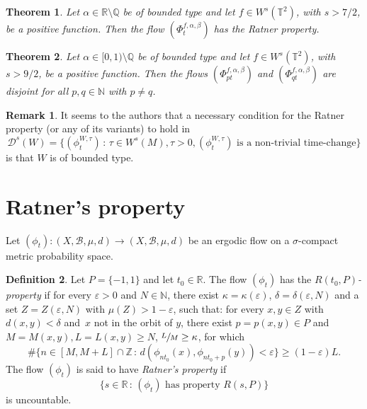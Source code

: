 \documentclass[10pt]{amsart}
\let\mathcal\mathscr
\let\epsilon\varepsilon
\newcommand{\sep}{\,:\,}
\theoremstyle{definition}
\newtheorem{definition}{Definition}[section]
\newtheorem{remark}[definition]{Remark}
\theoremstyle{plain}
\newtheorem{theorem}{Theorem}
\newcommand\NN{\mathbb{N}}
\newcommand\QQ{\mathbb{Q}}
\newcommand\RR{\mathbb{R}}
\newcommand\TT{\mathbb{T}}
\newcommand\ZZ{\mathbb{Z}}
\newcommand\cB{\mathcal{B}}
\newcommand{\cD}{\mathcal D}
\begin{document}
\begin{theorem}\label{thm:main} Let $\alpha\in \RR\setminus \QQ$ be of bounded type and let $f\in W^s(\TT^2)$, with $s>7/2$, be a positive function. Then the flow
$(\Phi_t^{f,\alpha, \beta})$ has the Ratner property.
\end{theorem}

\begin{theorem}\label{thm:main2} Let $\alpha \in [0,1)\setminus \QQ$ be of bounded type and let $f\in W^s(\TT^2)$, with $s>9/2$, be a positive function. Then the flows $(\Phi_{pt}^{f,\alpha,\beta})$ and $(\Phi_{qt}^{f,\alpha,\beta})$ are disjoint for all $p,q\in \NN$ with $p\neq q$.
\end{theorem}

\begin{remark} It seems to the authors that a necessary condition for the Ratner property (or any of its variants) to hold in
\[
\cD^s(W)=\{(\phi_t^{W,\tau})\sep \tau\in W^s(M), \tau>0, (\phi_t^{W,\tau}) \text{ is a non-trivial time-change}\}
\]
is that $W$ is of bounded type.
\end{remark}

\section{Ratner's property}\label{sec:rat}
Let $(\phi_t):(X,\cB,\mu,d)\to (X,\cB,\mu,d)$ be an ergodic flow on a $\sigma$-compact metric probability space.
\begin{definition}\label{def.rat} Let $P=\{-1,1\}$ and let $t_0\in \RR$. The flow $(\phi_t)$ has the \emph{$R(t_0,P)$\nobreakdash-property} if for every $\epsilon>0$ and $N\in \NN$, there exist
$\kappa =\kappa(\epsilon)$, $\delta =\delta(\epsilon,N)$ and a set $Z = Z(\epsilon,N)$ with $\mu(Z)>1-\epsilon$,
such that:
for every $x,y\in Z$ with $d(x,y) <\delta$ and~$x$ not in the orbit of $y$, there exist $p = p(x,y)\in P$ and $M = M(x,y), L = L(x,y)\geq N$, $\sfrac{L}{M}\geq \kappa$, for which
\[
\# \{n\in [M,M+L]\cap \ZZ\sep d(\phi_{nt_0}(x), \phi_{nt_0+p}(y))<\epsilon\}\geq (1-\epsilon)L.
\]
The flow $(\phi_t)$ is said to have \emph{Ratner's property} if
\[
\{s\in \RR\sep (\phi_t)\text{ has property } R(s,P)\}
\]
is uncountable.
\end{definition}
\end{document}
